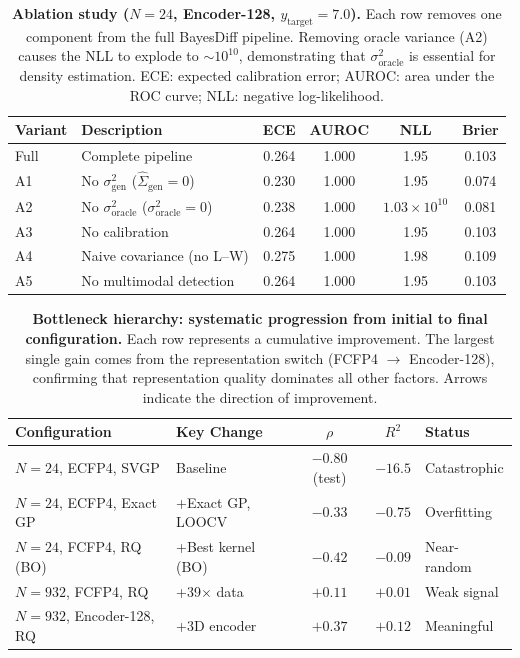 \documentclass{article}
\newcommand{\Ugen}{\sigma^{2}_{\mathrm{gen}}}
\newcommand{\Uoracle}{\sigma^{2}_{\mathrm{oracle}}}
\newcommand{\Siggen}{\hat{\Sigma}_{\mathrm{gen}}}
\newcommand{\ytarget}{y_{\mathrm{target}}}
\begin{document}
\begin{table}[h!]
\centering
\caption{\textbf{Ablation study ($N = 24$, Encoder-128, $\ytarget = 7.0$).}
Each row removes one component from the full BayesDiff pipeline.
Removing oracle variance (A2) causes the NLL to explode to
${\sim}10^{10}$, demonstrating that $\Uoracle$ is essential for
density estimation.  ECE: expected calibration error; AUROC: area under
the ROC curve; NLL: negative log-likelihood.}
\label{tab:ablation}
\begin{tabular}{@{}llcccc@{}}
\toprule
Variant & Description & ECE & AUROC & NLL & Brier \\
\midrule
Full    & Complete pipeline           & 0.264 & 1.000 & 1.95 & 0.103 \\
A1      & No $\Ugen$ ($\Siggen = 0$) & 0.230 & 1.000 & 1.95 & 0.074 \\
A2      & No $\Uoracle$ ($\Uoracle = 0$)& 0.238 & 1.000 & $1.03 \times 10^{10}$ & 0.081 \\
A3      & No calibration              & 0.264 & 1.000 & 1.95 & 0.103 \\
A4      & Naive covariance (no L--W)  & 0.275 & 1.000 & 1.98 & 0.109 \\
A5      & No multimodal detection     & 0.264 & 1.000 & 1.95 & 0.103 \\
\bottomrule
\end{tabular}
\end{table}

\begin{table}[h!]
\centering
\caption{\textbf{Bottleneck hierarchy: systematic progression from
initial to final configuration.}
Each row represents a cumulative improvement.  The largest single gain
comes from the representation switch (FCFP4 $\to$ Encoder-128),
confirming that representation quality dominates all other factors.
Arrows indicate the direction of improvement.}
\label{tab:hierarchy}
\begin{tabular}{@{}llccl@{}}
\toprule
Configuration & Key Change & $\rho$ & $R^{2}$ & Status \\
\midrule
$N\!=\!24$, ECFP4, SVGP  & Baseline & $-0.80$ (test) & $-16.5$ & Catastrophic \\
$N\!=\!24$, ECFP4, Exact GP  & +Exact GP, LOOCV & $-0.33$ & $-0.75$ & Overfitting \\
$N\!=\!24$, FCFP4, RQ (BO)  & +Best kernel (BO) & $-0.42$ & $-0.09$ & Near-random \\
$N\!=\!932$, FCFP4, RQ  & +39$\times$ data & $+0.11$ & $+0.01$ & Weak signal \\
$N\!=\!932$, Encoder-128, RQ  & +3D encoder & $+0.37$ & $+0.12$ & Meaningful \\
\bottomrule
\end{tabular}
\end{table}
\end{document}

